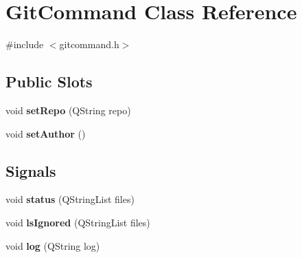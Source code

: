 \hypertarget{class_git_command}{
\section{GitCommand Class Reference}
\label{class_git_command}
}


{\ttfamily \#include $<$gitcommand.h$>$}

\subsection*{Public Slots}
\begin{DoxyCompactItemize}
\item 
\hypertarget{class_git_command_acf1a808942215645ff732632d62e44c1}{
void {\bfseries setRepo} (QString repo)}
\label{class_git_command_acf1a808942215645ff732632d62e44c1}

\item 
\hypertarget{class_git_command_a236ecf1595ab433f348cee33ec939a5a}{
void {\bfseries setAuthor} ()}
\label{class_git_command_a236ecf1595ab433f348cee33ec939a5a}

\end{DoxyCompactItemize}
\subsection*{Signals}
\begin{DoxyCompactItemize}
\item 
\hypertarget{class_git_command_a88243db55abf875014f39a15e611f392}{
void {\bfseries status} (QStringList files)}
\label{class_git_command_a88243db55abf875014f39a15e611f392}

\item 
\hypertarget{class_git_command_a59bc4148030ce8acc768bded0f3207e6}{
void {\bfseries lsIgnored} (QStringList files)}
\label{class_git_command_a59bc4148030ce8acc768bded0f3207e6}

\item 
\hypertarget{class_git_command_a197fd3565dbf4e5646b3b3ff19727575}{
void {\bfseries log} (QString log)}
\label{class_git_command_a197fd3565dbf4e5646b3b3ff19727575}

\end{DoxyCompactItemize}
